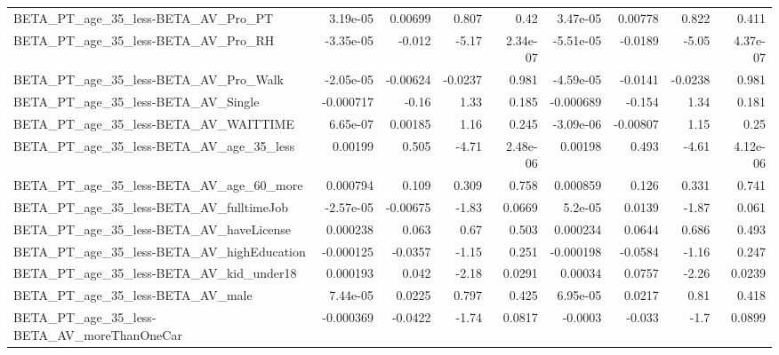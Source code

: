 \begin{tabular}{lrrrrrrrr}
BETA\_PT\_age\_35\_less-BETA\_AV\_Pro\_PT                 &    3.19e-05 &      0.00699 &     0.807 &     0.42 &   3.47e-05 &     0.00778 &        0.822 &         0.411 \\
BETA\_PT\_age\_35\_less-BETA\_AV\_Pro\_RH                 &   -3.35e-05 &       -0.012 &     -5.17 & 2.34e-07 &  -5.51e-05 &     -0.0189 &        -5.05 &      4.37e-07 \\
BETA\_PT\_age\_35\_less-BETA\_AV\_Pro\_Walk               &   -2.05e-05 &     -0.00624 &   -0.0237 &    0.981 &  -4.59e-05 &     -0.0141 &      -0.0238 &         0.981 \\
BETA\_PT\_age\_35\_less-BETA\_AV\_Single                 &   -0.000717 &        -0.16 &      1.33 &    0.185 &  -0.000689 &      -0.154 &         1.34 &         0.181 \\
BETA\_PT\_age\_35\_less-BETA\_AV\_WAITTIME               &    6.65e-07 &      0.00185 &      1.16 &    0.245 &  -3.09e-06 &    -0.00807 &         1.15 &          0.25 \\
BETA\_PT\_age\_35\_less-BETA\_AV\_age\_35\_less            &     0.00199 &        0.505 &     -4.71 & 2.48e-06 &    0.00198 &       0.493 &        -4.61 &      4.12e-06 \\
BETA\_PT\_age\_35\_less-BETA\_AV\_age\_60\_more            &    0.000794 &        0.109 &     0.309 &    0.758 &   0.000859 &       0.126 &        0.331 &         0.741 \\
BETA\_PT\_age\_35\_less-BETA\_AV\_fulltimeJob            &   -2.57e-05 &     -0.00675 &     -1.83 &   0.0669 &    5.2e-05 &      0.0139 &        -1.87 &         0.061 \\
BETA\_PT\_age\_35\_less-BETA\_AV\_haveLicense            &    0.000238 &        0.063 &      0.67 &    0.503 &   0.000234 &      0.0644 &        0.686 &         0.493 \\
BETA\_PT\_age\_35\_less-BETA\_AV\_highEducation          &   -0.000125 &      -0.0357 &     -1.15 &    0.251 &  -0.000198 &     -0.0584 &        -1.16 &         0.247 \\
BETA\_PT\_age\_35\_less-BETA\_AV\_kid\_under18            &    0.000193 &        0.042 &     -2.18 &   0.0291 &    0.00034 &      0.0757 &        -2.26 &        0.0239 \\
BETA\_PT\_age\_35\_less-BETA\_AV\_male                   &    7.44e-05 &       0.0225 &     0.797 &    0.425 &   6.95e-05 &      0.0217 &         0.81 &         0.418 \\
BETA\_PT\_age\_35\_less-BETA\_AV\_moreThanOneCar         &   -0.000369 &      -0.0422 &     -1.74 &   0.0817 &    -0.0003 &      -0.033 &         -1.7 &        0.0899 \\

\end{tabular}
